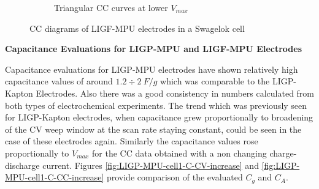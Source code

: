 \begin{figure}[H]
\begin{subfigure}{0.49\textwidth}
\captionsetup{width=0.9\linewidth}
\caption{Triangular CC curves at lower $V_{max}$}
\label{fig:LIGF-MPU-cell1-CC-2}
\end{subfigure}
\medskip
\caption{CC diagrams of LIGF-MPU electrodes in a Swagelok cell}
\label{fig:LIGF-MPU-CC}
\end{figure}

\textbf{Capacitance Evaluations for LIGP-MPU and LIGF-MPU Electrodes}

Capacitance evaluations for LIGP-MPU electrodes have shown relatively high capacitance values of around $1.2\div 2\:F/g$ which was comparable to the LIGP-Kapton Electrodes. Also there was a good consistency in numbers calculated from both types of electrochemical experiments. The trend which was previously seen for LIGP-Kapton electrodes, when capacitance grew proportionally to broadening of the CV weep window at the scan rate staying constant, could be seen in the case of these electrodes again. Similarly the capacitance values rose proportionally to $V_{max}$ for the CC data obtained with a non changing charge-discharge current. Figures \ref{fig:LIGP-MPU-cell1-C-CV-increase} and  \ref{fig:LIGP-MPU-cell1-C-CC-increase} provide comparison of the evaluated $C_g$ and $C_A$.

